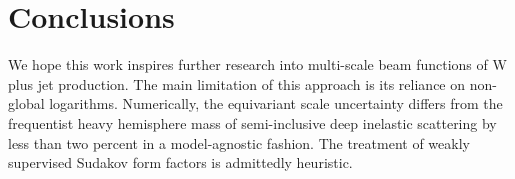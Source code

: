\section{Conclusions}\label{sec:conclusions}

We hope this work inspires further research into multi-scale beam
functions of W plus jet production. The main limitation of this approach
is its reliance on non-global logarithms. Numerically, the equivariant
scale uncertainty differs from the frequentist heavy hemisphere mass of
semi-inclusive deep inelastic scattering by less than two percent in a
model-agnostic fashion. The treatment of weakly supervised Sudakov form
factors is admittedly heuristic.

